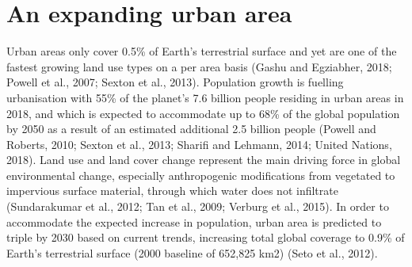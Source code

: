 \documentclass[]{book}
\begin{document}
\section{An expanding urban area}\label{an-expanding-urban-area}

Urban areas only cover 0.5\% of Earth's terrestrial surface and yet are
one of the fastest growing land use types on a per area basis (Gashu and
Egziabher, 2018; Powell et al., 2007; Sexton et al., 2013). Population
growth is fuelling urbanisation with 55\% of the planet's 7.6 billion
people residing in urban areas in 2018, and which is expected to
accommodate up to 68\% of the global population by 2050 as a result of
an estimated additional 2.5 billion people (Powell and Roberts, 2010;
Sexton et al., 2013; Sharifi and Lehmann, 2014; United Nations, 2018).
Land use and land cover change represent the main driving force in
global environmental change, especially anthropogenic modifications from
vegetated to impervious surface material, through which water does not
infiltrate (Sundarakumar et al., 2012; Tan et al., 2009; Verburg et al.,
2015). In order to accommodate the expected increase in population,
urban area is predicted to triple by 2030 based on current trends,
increasing total global coverage to 0.9\% of Earth's terrestrial surface
(2000 baseline of 652,825 km2) (Seto et al., 2012).
\end{document}
